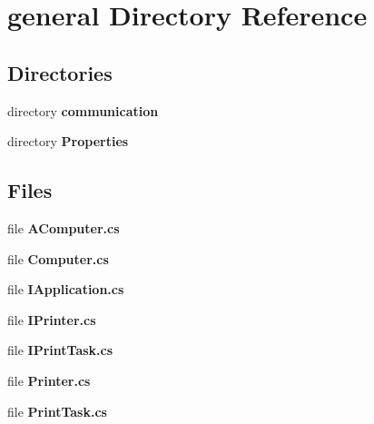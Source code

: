 \section{general Directory Reference}
\label{dir_bba024cd03edd7f9d6096b84e1006209}
\subsection*{Directories}
\begin{DoxyCompactItemize}
\item 
directory {\bf communication}
\item 
directory {\bf Properties}
\end{DoxyCompactItemize}
\subsection*{Files}
\begin{DoxyCompactItemize}
\item 
file {\bf A\-Computer.\-cs}
\item 
file {\bf Computer.\-cs}
\item 
file {\bf I\-Application.\-cs}
\item 
file {\bf I\-Printer.\-cs}
\item 
file {\bf I\-Print\-Task.\-cs}
\item 
file {\bf Printer.\-cs}
\item 
file {\bf Print\-Task.\-cs}
\end{DoxyCompactItemize}
